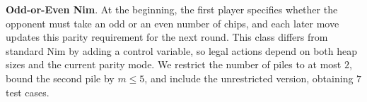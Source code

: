 \documentclass[review]{elsarticle}
\newcommand{\set}[1]{\{ #1 \}}
\newcommand{\tuple}[1]{\langle {#1} \rangle}
\newcommand{\true}{\top}
\newcommand{\statevar}{\mathcal{X}}
\newcommand{\act}{\mathcal{A}}
\newcommand{\constraint}{\mathcal{C}}
\newcommand{\estate}{\mathcal{E}}
\newcommand{\pre}{\mathtt{pre}}
\newcommand{\eff}{\mathtt{eff}}
\newcommand{\modulo}{\equiv}
\begin{document}
{\color{red}\textbf{Odd-or-Even Nim}. At the beginning, the first player specifies whether the opponent must take an odd or an even number of chips, and each later move updates this parity requirement for the next round.}
{\color{red}This class differs from standard Nim by adding a control variable, so legal actions depend on both heap sizes and the current parity mode.}
{\color{red}We restrict the number of piles to at most $2$, bound the second pile by $m \le 5$, and include the unrestricted version, obtaining $7$ test cases.}
\end{document}
